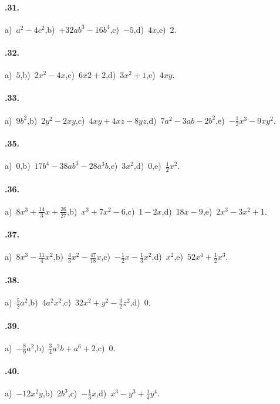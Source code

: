 \paragraph{\thechapter.31.} a)~$a^{2}-4c^{2}$,\quad b)~$+32ab^{3}-16b^{4}$,\quad c)~$-5$,\quad d)~$4x$,\quad e)~$2$.
\paragraph{\thechapter.32.} a)~$5$,\quad b)~$2x^{2}-4x$,\quad c)~$6x{2}+2$,\quad d)~$3x^{2}+1$,\quad e)~$4xy$.
\paragraph{\thechapter.33.} a)~$9b^2$,\quad b)~$2y^{2}-2xy$,\quad c)~$4xy+4xz-8yz$,\quad d)~$7a^2-3ab-2b^2$,\quad e)~$-\frac{1}{2}x^{3}-9xy^{2}$.
\paragraph{\thechapter.35.} a)~$0$,\quad b)~$17b^{4}-38{ab}^{3}-28a^{3}b$,\quad c)~$3x^{2}$,\quad d)~$0$,\quad e)~$\frac{1}{2}x^{2}$.
\paragraph{\thechapter.36.} a)~$8x^{3}+\frac{14}{3}x+\frac{26}{27}$,\quad b)~$x^{3}+7x^{2}-6$,\quad c)~$1-2x$,\quad d)~$18x-9$,\quad e)~$2x^3-3x^2+1$.
\paragraph{\thechapter.37.} a)~$8x^{3}-\frac{11}{4}x^{2}$,\quad b)~$\frac{4}{3}x^{2}-\frac{47}{18}x$,\quad c)~$-{\frac{1}{2}}x-\frac{1}{3}x^{2}$,\quad d)~$x^2$,\quad e)~$52x^4+\frac{1}{2}x^3$.
\paragraph{\thechapter.38.} a)~$\frac{5}{2}a^{2}$,\quad b)~$4a^{2}x^{2}$,\quad c)~$32x^{2}+y^{2}-\frac{3}{2}z^{2}$,\quad d)~$0$.
\paragraph{\thechapter.39.} a)~$-\frac{8}{9}a^{2}$,\quad b)~$\frac{3}{4}a^{2}b+a^{6}+2$,\quad c)~$0$.
\paragraph{\thechapter.40.} a)~$-12x^{2}y$,\quad b)~$2b^3$,\quad c)~$-\frac{1}{3}x$,\quad d)~$x^3-y^3+\frac{1}{4}y^4$.
